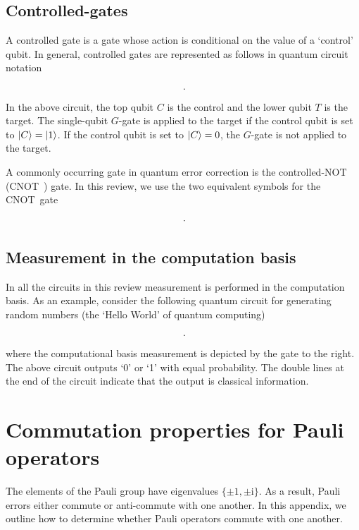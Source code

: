 \documentclass[]{arxiv}
\theoremstyle{plain}%
\theoremstyle{definition}
\theoremstyle{remark}
\newcommand{\cnot}{\leavevmode\hbox{\footnotesize{CNOT }}}
\begin{document}
\subsection{Controlled-gates}


A controlled gate is a gate whose action is conditional on the value of a `control' qubit. In general, controlled gates are represented as follows in quantum circuit notation   
%
$$
\vcenter{\hbox{
		\resizebox{!}{!}{}}}\rm.
$$
%
In the above circuit, the top qubit $C$ is the control and the lower qubit $T$ is the target. The single-qubit $G$-gate is applied to the target if the control qubit is set to $\ket{C}=\ket{1}$. If the control qubit is set to $\ket{C}=0$, the $G$-gate is not applied to the target.

A commonly occurring gate in quantum error correction is the controlled-NOT (\cnot) gate. In this review, we use the two equivalent symbols for the \cnot gate
%
$$
\vcenter{\hbox{
		\resizebox{!}{!}{}}}\rm.
$$
%

\subsection{Measurement in the computation basis}

In all the circuits in this review measurement is performed in the computation basis. As an example, consider the following quantum circuit for generating random numbers (the `Hello World' of quantum computing)
%
$$
\vcenter{\hbox{
		\resizebox{!}{!}{}}}\rm.
$$
%
where the computational basis measurement is depicted by the gate to the right. The above circuit outputs `0' or `1' with equal probability. The double lines at the end of the circuit indicate that the output is classical information. 






\section{Commutation properties for Pauli operators}\label{app:pauli_commute}

The elements of the Pauli group have eigenvalues $\{\pm 1, \pm \text{i}\}$. As a result, Pauli errors either commute or anti-commute with one another. In this appendix, we outline how to determine whether Pauli operators commute with one another.
\end{document}
